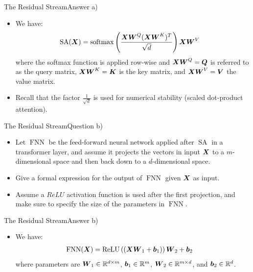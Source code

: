 \documentclass[t]{beamer}
\newcommand\op[1]{\operatorname{#1}}
\begin{document}
\begin{frame}{The Residual Stream}{Answer a)}
    \begin{itemize}
        \item We have:
              \begin{align}
                  \op{SA}(\mX) & = \op{softmax}\left(\frac{\mX\mW^Q(\mX\mW^K)^T}{\sqrt{d}}\right)\mX\mW^V
              \end{align}
              where the softmax function is applied row-wise and
              ${\boldsymbol{X}}{\boldsymbol{W}}^Q = {\boldsymbol{Q}}$ is referred to as the query matrix,
              ${\boldsymbol{X}}{\boldsymbol{W}}^K = {\boldsymbol{K}}$ is the key matrix, and ${\boldsymbol{X}}{\boldsymbol{W}}^V = {\boldsymbol{V}}$ the value
              matrix.
        \item Recall that the factor $\frac{1}{\sqrt{d}}$ is used for numerical
              stability (scaled dot-product attention).
    \end{itemize}
\end{frame}

\begin{frame}{The Residual Stream}{Question b)}
    \begin{itemize}
        \item Let $\op{FNN}$ be the feed-forward neural network applied after
              $\op{SA}$ in a transformer layer, and assume it projects the
              vectors in input ${\boldsymbol{X}}$ to a $m$-dimensional space and then back
              down to a $d$-dimensional space.
        \item Give a formal expression for the output of $\op{FNN}$ given ${\boldsymbol{X}}$
              as input.
        \item Assume a $ReLU$ activation function is used after the first
              projection, and make sure to specify the size of the parameters
              in $\op{FNN}$.
    \end{itemize}
\end{frame}

\begin{frame}{The Residual Stream}{Answer b)}
    \begin{itemize}
        \item We have:
              \begin{align}
                  \op{FNN}(\mX) & = \text{ReLU}\left((\mX\mW_1 + \vb_1)\right)\mW_2 + \vb_2
              \end{align}
              where parameters are ${\boldsymbol{W}}_1\in\mathbb{R}^{d\times m}$,
              ${\boldsymbol{b}}_1\in\mathbb{R}^m$, ${\boldsymbol{W}}_2\in\mathbb{R}^{m\times d}$, and
              ${\boldsymbol{b}}_2\in\mathbb{R}^d$.
    \end{itemize}
\end{frame}
\end{document}
